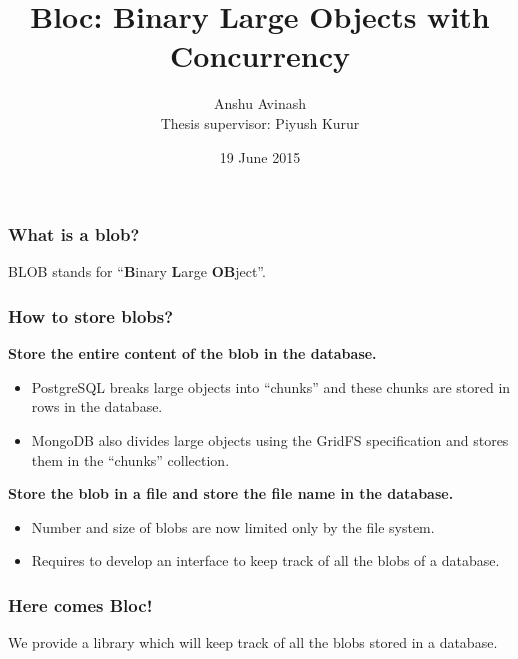 \documentclass[10pt]{beamer}
\title{Bloc: Binary Large Objects with Concurrency}
\subtitle{}
\date{19 June 2015}
\author{Anshu Avinash \\
  Thesis supervisor: Piyush Kurur}
\institute{Department of CSE, IIT Kanpur}
\begin{document}
\maketitle

\begin{frame}
  \frametitle{What is a blob?}

  BLOB stands for ``\textbf{B}inary \textbf{L}arge \textbf{OB}ject''.
  \begin{center}
  \end{center}

\end{frame}

\begin{frame}[allowframebreaks]
  \frametitle{How to store blobs?}

  \textbf {Store the entire content of the blob in the database.}
  \begin{itemize}
    \item PostgreSQL breaks large objects into ``chunks'' and these chunks are
      stored in rows in the database.
    \item MongoDB also divides large objects using the GridFS specification and stores
      them in the ``chunks'' collection.
  \end{itemize}

  \framebreak

  \textbf {Store the blob in a file and store the file name in the database.}
  \begin{itemize}
    \item Number and size of blobs are now limited only by the file system.
    \item Requires to develop an interface to keep track of all the blobs of a database.
  \end{itemize}
\end{frame}

\begin{frame}
  \frametitle{Here comes Bloc!}

  We provide a library which will keep track of all the blobs stored in a database. \\

\end{frame}
\end{document}
